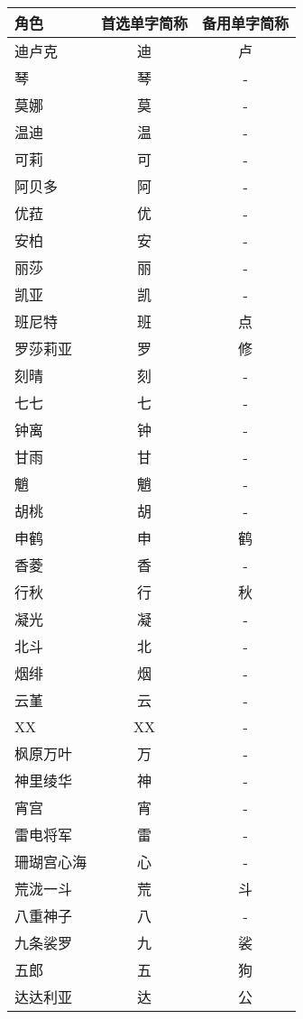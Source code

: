 \documentclass[a4paper,11pt]{report}
\begin{document}
\begin{longtabu}{|X[c]|c|c|}
	\hline
	{角色} & {首选单字简称} & {备用单字简称} \\
	\hline
	\endhead
	\hline
	\endfoot
	{迪卢克} & {迪} & {卢} \\
	{琴} & {琴} & {-} \\
	{莫娜} & {莫} & {-} \\
	{温迪} & {温} & {-} \\
	{可莉} & {可} & {-} \\
	{阿贝多} & {阿} & {-} \\
	{优菈} & {优} & {-} \\
	\hline
	{安柏} & {安} & {-} \\
	{丽莎} & {丽} & {-} \\
	{凯亚} & {凯} & {-} \\
	{班尼特} & {班} & {点} \\
	{罗莎莉亚} & {罗} & {修} \\
	\hline
	{刻晴} & {刻} & {-} \\
	{七七} & {七} & {-} \\
	{钟离} & {钟} & {-} \\
	{甘雨} & {甘} & {-} \\
	{魈} & {魈} & {-} \\
	{胡桃} & {胡} & {-} \\
	{申鹤} & {申} & {鹤} \\
	\hline
	{香菱} & {香} & {-} \\
	{行秋} & {行} & {秋} \\
	{凝光} & {凝} & {-} \\
	{北斗} & {北} & {-} \\
	{烟绯} & {烟} & {-} \\
	{云堇} & {云} & {-} \\
	{XX} & {XX} & {-} \\
	\hline
	{枫原万叶} & {万} & {-} \\
	{神里绫华} & {神} & {-} \\
	{宵宫} & {宵} & {-} \\
	{雷电将军} & {雷} & {-} \\
	{珊瑚宫心海} & {心} & {-} \\
	{荒泷一斗} & {荒} & {斗} \\
	\hline
	{八重神子} & {八} & {-} \\
	{九条裟罗} & {九} & {裟} \\
	{五郎} & {五} & {狗} \\
	\hline
	{达达利亚} & {达} & {公} \\
\end{longtabu}
\end{document}
